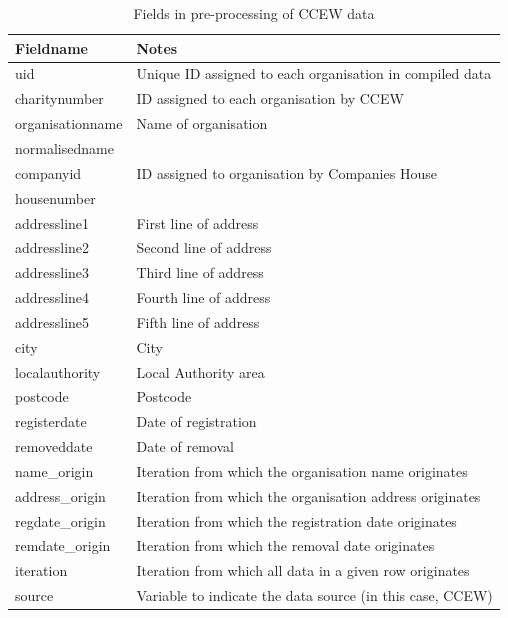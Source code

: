 \documentclass{article}
\begin{document}
\begin{table}[h]
  \centering
  \begin{tabularx}{\textwidth}{|l|X|}
    \hline
    Fieldname  &	Notes \\
    \hline \hline

uid &  Unique ID assigned to each organisation in compiled data \\ \hline
charitynumber &  ID assigned to each organisation by CCEW \\ \hline
organisationname &  Name of organisation \\ \hline
normalisedname &  \\ \hline
companyid &  ID assigned to organisation by Companies House \\ \hline
housenumber &  \\ \hline
addressline1 &  First line of address \\ \hline
addressline2 &  Second line of address \\ \hline
addressline3 &  Third line of address \\ \hline
addressline4 &  Fourth line of address \\ \hline
addressline5 &  Fifth line of address \\ \hline
city &  City \\ \hline
localauthority &  Local Authority area \\ \hline
postcode &  Postcode \\ \hline
registerdate &  Date of registration \\ \hline
removeddate &  Date of removal \\ \hline
name\_origin &  Iteration from which the organisation name originates \\ \hline
address\_origin &  Iteration from which the organisation address originates \\ \hline
regdate\_origin &  Iteration from which the registration date originates \\ \hline
remdate\_origin &  Iteration from which the removal date originates \\ \hline
iteration &  Iteration from which all data in a given row originates \\ \hline
source &  Variable to indicate the data source (in this case, CCEW) \\ \hline
% 
  \end{tabularx}
\caption{Fields in pre-processing of CCEW data}
\label{tab:ccew_preprocess}
\end{table}
\end{document}
